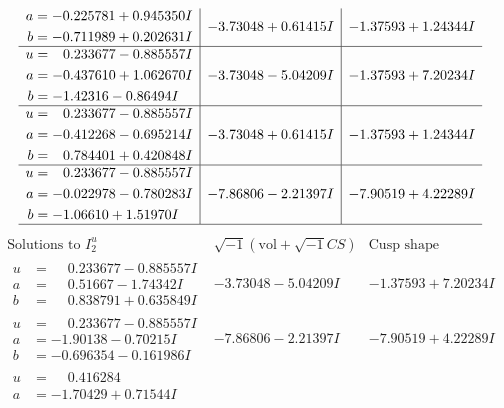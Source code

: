 \documentclass[1p]{elsarticle_modified}
\theoremstyle{definition}
\newcommand{\I}{\sqrt{-1}}
\begin{document}
$$\begin{array}{c|c|c}
\begin{aligned}
a &= -0.225781 + 0.945350 I \\
b &= -0.711989 + 0.202631 I\end{aligned}
 & -3.73048 + 0.61415 I & -1.37593 + 1.24344 I \\ \hline\begin{aligned}
u &= \phantom{-}0.233677 - 0.885557 I \\
a &= -0.437610 + 1.062670 I \\
b &= -1.42316 - 0.86494 I\end{aligned}
 & -3.73048 - 5.04209 I & -1.37593 + 7.20234 I \\ \hline\begin{aligned}
u &= \phantom{-}0.233677 - 0.885557 I \\
a &= -0.412268 - 0.695214 I \\
b &= \phantom{-}0.784401 + 0.420848 I\end{aligned}
 & -3.73048 + 0.61415 I & -1.37593 + 1.24344 I \\ \hline\begin{aligned}
u &= \phantom{-}0.233677 - 0.885557 I \\
a &= -0.022978 - 0.780283 I \\
b &= -1.06610 + 1.51970 I\end{aligned}
 & -7.86806 - 2.21397 I & -7.90519 + 4.22289 I\\
 \hline 
 \end{array}$$\newpage$$\begin{array}{c|c|c}  
\text{Solutions to }I^u_{2}& \I (\text{vol} + \sqrt{-1}CS) & \text{Cusp shape}\\
 \hline 
\begin{aligned}
u &= \phantom{-}0.233677 - 0.885557 I \\
a &= \phantom{-}0.51667 - 1.74342 I \\
b &= \phantom{-}0.838791 + 0.635849 I\end{aligned}
 & -3.73048 - 5.04209 I & -1.37593 + 7.20234 I \\ \hline\begin{aligned}
u &= \phantom{-}0.233677 - 0.885557 I \\
a &= -1.90138 - 0.70215 I \\
b &= -0.696354 - 0.161986 I\end{aligned}
 & -7.86806 - 2.21397 I & -7.90519 + 4.22289 I \\ \hline\begin{aligned}
u &= \phantom{-}0.416284\phantom{ +0.000000I} \\
a &= -1.70429 + 0.71544 I \\

\end{aligned}
\end{array}$$
\end{document}
